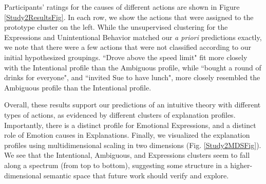 \documentclass[10pt,letterpaper]{article}
\newcommand{\red}[1]{\textcolor{Red}{#1}}
\newcommand{\ndg}[1]{\textcolor{Green}{[ndg: #1]}}
\begin{document}
Participants' ratings for the causes of different actions are shown in Figure \ref{Study2ResultsFig}. In each row, we show the actions that were assigned to the prototype cluster on the left. 
While the unsupervised clustering for the Expressions and Unintentional Behavior matched our \textit{a priori} predictions exactly, we note that there were a few actions that were not classified according to our initial hypothesized groupings. ``Drove above the speed limit" fit more closely with the Intentional profile than the Ambiguous profile, while ``bought a round of drinks for everyone", and ``invited Sue to have lunch", more closely resembled the Ambiguous profile than the Intentional profile.

Overall, these results support our predictions of an intuitive theory with different types of actions, as evidenced by different clusters of explanation profiles. Importantly, there is a distinct profile for Emotional Expressions, and a distinct role of Emotion causes in Explanations.
Finally, we visualized the explanation profiles using multidimensional scaling in two dimensions (Fig. \ref{Study2MDSFig}). We see that the Intentional, Ambiguous, and Expressions clusters seem to fall along a spectrum (from top to bottom), suggesting some structure in a higher-dimensional semantic space that future work should verify and explore.





\end{document}
